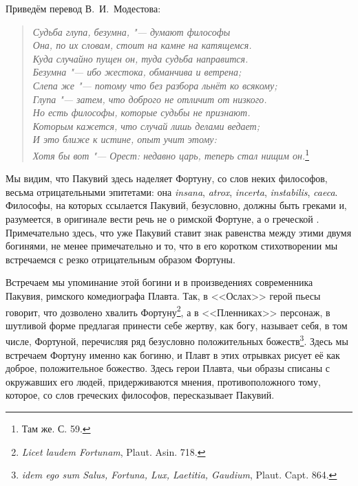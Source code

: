 Приведём перевод В.~И.~Модестова: 

\begin{verse}
\textit{Судьба глупа, безумна, "--- думают философы\\
Она, по их словам, стоит на камне на катящемся.\\
Куда случайно пущен он, туда судьба направится.\\
Безумна "--- ибо жестока, обманчива и ветрена;\\
Слепа же "--- потому что без разбора льнёт ко всякому;\\
Глупа "--- затем, что доброго не отличит от низкого.\\
Но есть философы, которые судьбы не признают.\\
Которым кажется, что случай лишь делами ведает;\\
И это ближе к истине, опыт учит этому:\\
Хотя бы вот "--- Орест: недавно царь, теперь стал нищим он.}\footnote{Там же. С. 59.}
\end{verse}

Мы видим, что Пакувий здесь наделяет Фортуну, со слов неких философов, весьма отрицательными эпитетами: она \textit{insana}, \textit{atrox}, \textit{incerta}, \textit{instabilis}, \textit{caeca}. Философы, на которых ссылается Пакувий, безусловно, должны быть греками и, разумеется, в оригинале вести речь не о римской Фортуне, а о греческой . Примечательно здесь, что уже Пакувий ставит знак равенства между этими двумя богинями, не менее примечательно и то, что в его коротком стихотворении мы встречаемся с резко отрицательным образом Фортуны. %

Встречаем мы упоминание этой богини и в произведениях современника Пакувия, римского комедиографа Плавта. Так, в <<Ослах>> герой пьесы говорит, что дозволено хвалить Фортуну\footnote{\textit{Licet laudem Fortunam}, Plaut. Asin. 718.}, а в <<Пленниках>> персонаж, в шутливой форме предлагая принести себе жертву, как богу, называет себя, в том числе, Фортуной, перечисляя ряд безусловно положительных божеств\footnote{\textit{idem ego sum Salus, Fortuna, Lux, Laetitia, Gaudium}, Plaut. Capt. 864.}. Здесь мы встречаем Фортуну именно как богиню, и Плавт в этих отрывках рисует её как доброе, положительное божество. Здесь герои Плавта, чьи образы списаны с окружавших его людей, придерживаются мнения, противоположного тому, которое, со слов греческих философов, пересказывает Пакувий.

